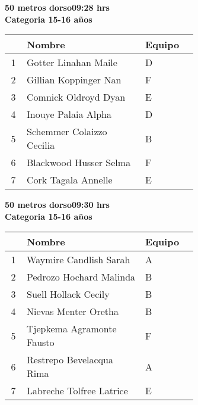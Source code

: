 \begin{minipage}{0.95\linewidth}\vspace{0.5cm} 
\begin{flushleft}
\textbf{
\hspace{-0.15cm}50 metros dorso\hspace{1.5cm}09:28 hrs \\Categoria 15-16 años}\vspace{-0.2cm} 
\end{flushleft}
\begin{tabular}{cp{0.63\linewidth}l}
\hline
& \textbf{Nombre} & \textbf{Equipo} \\ \hline
1 & Gotter Linahan Maile & D \\ 
2 & Gillian Koppinger Nan & F \\ 
3 & Comnick Oldroyd Dyan & E \\ 
4 & Inouye Palaia Alpha & D \\ 
5 & Schemmer Colaizzo Cecilia & B \\ 
6 & Blackwood Husser Selma & F \\ 
7 & Cork Tagala Annelle & E \\ 
\end{tabular}
\end{minipage}
\begin{minipage}{0.95\linewidth}\vspace{0.5cm} 
\begin{flushleft}
\textbf{
\hspace{-0.15cm}50 metros dorso\hspace{1.5cm}09:30 hrs \\Categoria 15-16 años}\vspace{-0.2cm} 
\end{flushleft}
\begin{tabular}{cp{0.63\linewidth}l}
\hline
& \textbf{Nombre} & \textbf{Equipo} \\ \hline
1 & Waymire Candlish Sarah & A \\ 
2 & Pedrozo Hochard Malinda & B \\ 
3 & Suell Hollack Cecily & B \\ 
4 & Nievas Menter Oretha & B \\ 
5 & Tjepkema Agramonte Fausto & F \\ 
6 & Restrepo Bevelacqua Rima & A \\ 
7 & Labreche Tolfree Latrice & E \\ 
\end{tabular}
\end{minipage}
